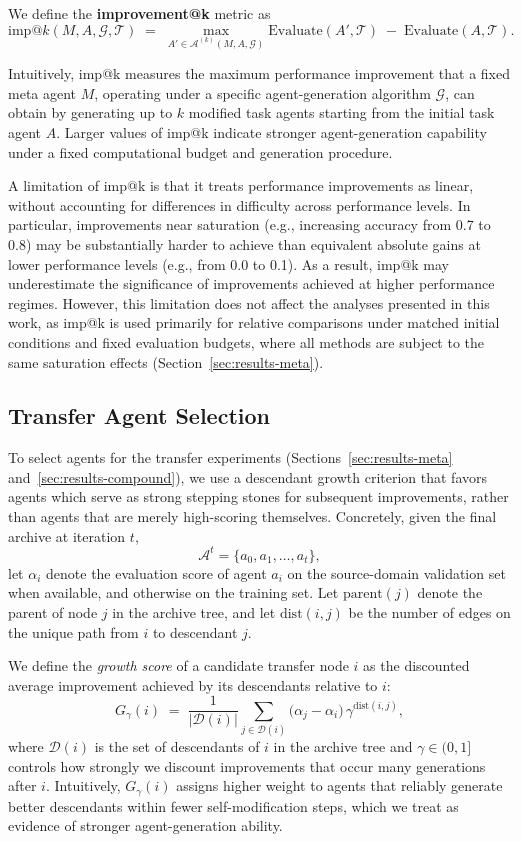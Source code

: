 We define the \textbf{improvement@k} metric as
\[
\mathrm{imp@}k(M, A, \mathcal{G}, \mathcal{T})
\;=\;
\max_{A' \in \mathcal{A}^{(k)}(M, A, \mathcal{G})}
\mathrm{Evaluate}(A', \mathcal{T})
\;-\;
\mathrm{Evaluate}(A, \mathcal{T}).
\]

Intuitively, imp@k measures the maximum performance improvement that a fixed meta agent $M$, operating under a specific agent-generation algorithm $\mathcal{G}$, can obtain by generating up to $k$ modified task agents starting from the initial task agent $A$. Larger values of imp@k indicate stronger agent-generation capability under a fixed computational budget and generation procedure.

A limitation of imp@k is that it treats performance improvements as linear, without accounting for differences in difficulty across performance levels. In particular, improvements near saturation (e.g., increasing accuracy from 0.7 to 0.8) may be substantially harder to achieve than equivalent absolute gains at lower performance levels (e.g., from 0.0 to 0.1). As a result, imp@k may underestimate the significance of improvements achieved at higher performance regimes. However, this limitation does not affect the analyses presented in this work, as imp@k is used primarily for relative comparisons under matched initial conditions and fixed evaluation budgets, where all methods are subject to the same saturation effects (Section~\ref{sec:results-meta}).

\subsection{Transfer Agent Selection}
\label{app:transfer-selection}

To select agents for the transfer experiments (Sections~\ref{sec:results-meta} and~\ref{sec:results-compound}), we use a descendant growth criterion that favors agents which serve as strong stepping stones for subsequent improvements, rather than agents that are merely high-scoring themselves.
Concretely, given the final archive at iteration $t$,
\[
\mathcal{A}^t = \{a_0, a_1, \dots, a_t\},
\]
let $\alpha_i$ denote the evaluation score of agent $a_i$ on the source-domain validation set when available, and otherwise on the training set.
Let $\mathrm{parent}(j)$ denote the parent of node $j$ in the archive tree, and let $\mathrm{dist}(i,j)$ be the number of edges on the unique path from $i$ to descendant $j$.

We define the \emph{growth score} of a candidate transfer node $i$ as the discounted average improvement achieved by its descendants relative to $i$:
\[
G_\gamma(i)
\;=\;
\frac{1}{|\mathcal{D}(i)|}
\sum_{j \in \mathcal{D}(i)}
\bigl(\alpha_j - \alpha_i\bigr)\,\gamma^{\mathrm{dist}(i,j)},
\]
where $\mathcal{D}(i)$ is the set of descendants of $i$ in the archive tree and $\gamma \in (0,1]$ controls how strongly we discount improvements that occur many generations after $i$.
Intuitively, $G_\gamma(i)$ assigns higher weight to agents that reliably generate better descendants within fewer self-modification steps, which we treat as evidence of stronger agent-generation ability.


